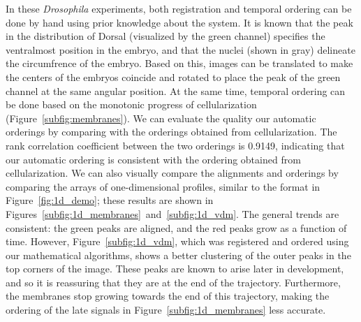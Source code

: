 \documentclass{pnastwo}
\begin{document}
\begin{article}
In these {\em Drosophila} experiments, both registration and temporal ordering can be done by hand using prior knowledge about the system. 
%
It is known that the peak in the distribution of Dorsal (visualized by the green channel) specifies the ventralmost position in the embryo, and that the nuclei (shown in gray) delineate the circumfrence of the embryo. 
%
Based on this, images can be translated to make the centers of the embryos coincide and rotated to place the peak of the green channel at the same angular position. 
%
At the same time, temporal ordering can be done based on the monotonic progress of cellularization (Figure~\ref{subfig:membranes}). 
%
We can evaluate the quality our automatic orderings by comparing with the orderings obtained from cellularization.
%
The rank correlation coefficient between the two orderings is 0.9149, indicating that our automatic ordering is consistent with the ordering obtained from cellularization.
%
We can also visually compare the alignments and orderings by comparing the arrays of one-dimensional profiles, similar to the format in Figure~\ref{fig:1d_demo};
these results are shown in Figures~\ref{subfig:1d_membranes}~and~\ref{subfig:1d_vdm}.
%
The general trends are consistent:
the green peaks are aligned, and the red peaks grow as a function of time. 
%
However, Figure~\ref{subfig:1d_vdm}, which was registered and ordered using our mathematical algorithms, shows a better clustering of the outer peaks in the top corners of the image.
%
%
These peaks are known to arise later in development, and so it is reassuring that they are at the end of the trajectory.
%
Furthermore, the membranes stop growing towards the end of this trajectory, making the ordering of the late signals in Figure~\ref{subfig:1d_membranes} less accurate.



\end{article}
\end{document}
